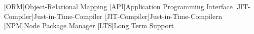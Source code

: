 [ORM]{Object-Relational Mapping}
[API]{Application Programming Interface}
[JIT-Compiler]{Just-in-Time-Compiler}
[JIT-Compiler]{Just-in-Time-Compilern}
[NPM]{Node Package Manager}
[LTS]{Long Term Support}